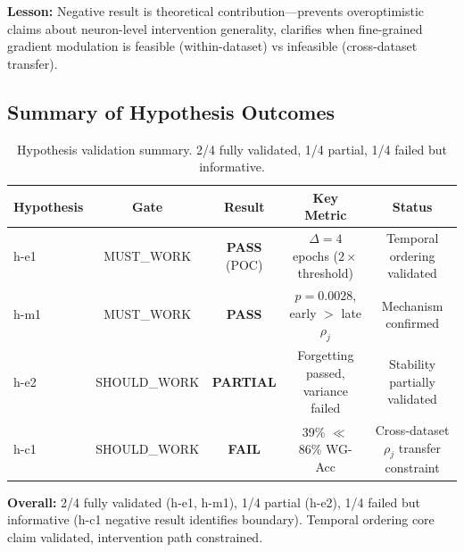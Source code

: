 \textbf{Lesson:} Negative result is theoretical contribution---prevents overoptimistic claims about neuron-level intervention generality, clarifies when fine-grained gradient modulation is feasible (within-dataset) vs infeasible (cross-dataset transfer).

\subsection{Summary of Hypothesis Outcomes}

\begin{table}[h]
\centering
\small
\begin{tabular}{lcccc}
\toprule
\textbf{Hypothesis} & \textbf{Gate} & \textbf{Result} & \textbf{Key Metric} & \textbf{Status} \\
\midrule
h-e1 & MUST\_WORK & \textbf{PASS} (POC) & $\Delta = 4$ epochs ($2\times$ threshold) & Temporal ordering validated \\
h-m1 & MUST\_WORK & \textbf{PASS} & $p = 0.0028$, early $>$ late $\rho_j$ & Mechanism confirmed \\
h-e2 & SHOULD\_WORK & \textbf{PARTIAL} & Forgetting passed, variance failed & Stability partially validated \\
h-c1 & SHOULD\_WORK & \textbf{FAIL} & 39\% $\ll$ 86\% WG-Acc & Cross-dataset $\rho_j$ transfer constraint \\
\bottomrule
\end{tabular}
\caption{Hypothesis validation summary. 2/4 fully validated, 1/4 partial, 1/4 failed but informative.}
\end{table}

\textbf{Overall:} 2/4 fully validated (h-e1, h-m1), 1/4 partial (h-e2), 1/4 failed but informative (h-c1 negative result identifies boundary). Temporal ordering core claim validated, intervention path constrained.
